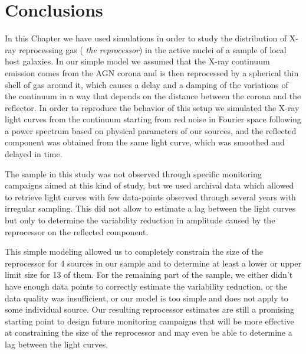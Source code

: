 \section{Conclusions}
In this Chapter we have used simulations in order to study the distribution of X-ray reprocessing gas (\emph{ the reprocessor}) in the active nuclei of a sample of local host galaxies. 
In our simple model we assumed that the X-ray continuum emission comes from the AGN corona and is then reprocessed by a spherical thin shell of gas around it, which causes a delay and a damping of the variations of the continuum in a way that depends on the distance between the corona and the reflector. In order to reproduce the behavior of this setup we simulated the X-ray light curves from the continuum starting from red noise in Fourier space following a power spectrum based on physical parameters of our sources, and the reflected component was obtained from the same light curve, which was smoothed and delayed in time.

The sample in this study was not observed through specific monitoring campaigns aimed at this kind of study, but we used archival data which allowed to retrieve light curves with few data-points observed through several years with irregular sampling. This did not allow to estimate a lag between the light curves but only to determine the variability reduction in amplitude caused by the reprocessor on the reflected component.

This simple modeling allowed us to completely constrain the size of the reprocessor for 4 sources in our sample and to determine at least a lower or upper limit size for 13 of them. For the remaining part of the sample, we either didn't have enough data points to correctly estimate the variability reduction, or the data quality was insufficient, or our model is too simple and does not apply to some individual source. Our resulting reprocessor estimates are still a promising starting point to design future monitoring campaigns that will be more effective at constraining the size of the reprocessor and may even be able to determine a lag between the light curves.

